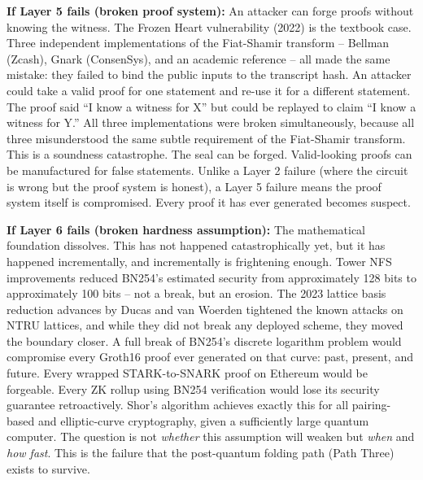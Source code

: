 \documentclass[
  11pt,
  openany]{report}
\renewcommand{\textbf}[1]{{\bfseries\color{MidnightBold}#1}}
\begin{document}
\textbf{If Layer 5 fails (broken proof system):} An attacker can forge proofs
without knowing the witness. The Frozen Heart vulnerability (2022) is the
textbook case. Three independent implementations of the Fiat-Shamir transform --
Bellman (Zcash), Gnark (ConsenSys), and an academic reference -- all made the
same mistake: they failed to bind the public inputs to the transcript hash. An
attacker could take a valid proof for one statement and re-use it for a
different statement. The proof said ``I know a witness for X'' but could be
replayed to claim ``I know a witness for Y.'' All three implementations were
broken simultaneously, because all three misunderstood the same subtle
requirement of the Fiat-Shamir transform. This is a soundness catastrophe. The
seal can be forged. Valid-looking proofs can be manufactured for false
statements. Unlike a Layer 2 failure (where the circuit is wrong but the proof
system is honest), a Layer 5 failure means the proof system itself is
compromised. Every proof it has ever generated becomes suspect.

\textbf{If Layer 6 fails (broken hardness assumption):} The mathematical
foundation dissolves. This has not happened catastrophically yet, but it has
happened incrementally, and incrementally is frightening enough. Tower NFS
improvements reduced BN254's estimated security from approximately 128 bits to
approximately 100 bits -- not a break, but an erosion. The 2023 lattice basis
reduction advances by Ducas and van Woerden tightened the known attacks on NTRU
lattices, and while they did not break any deployed scheme, they moved the
boundary closer. A full break of BN254's discrete logarithm problem would
compromise every Groth16 proof ever generated on that curve: past, present, and
future. Every wrapped STARK-to-SNARK proof on Ethereum would be forgeable. Every
ZK rollup using BN254 verification would lose its security guarantee
retroactively. Shor's algorithm achieves exactly this for all pairing-based and
elliptic-curve cryptography, given a sufficiently large quantum computer. The
question is not \emph{whether} this assumption will weaken but \emph{when} and
\emph{how fast}. This is the failure that the post-quantum folding path (Path
Three) exists to survive.
\end{document}
